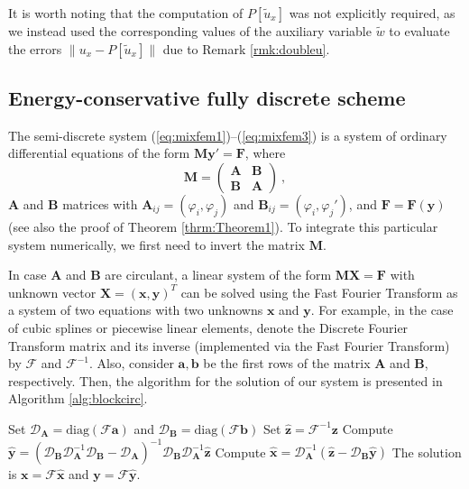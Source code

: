 \documentclass{amsart}
\newcommand{\diag}{\mathrm{diag}}
\newcommand{\by}{\mathbf{y}}
\newcommand{\ba}{\mathbf{a}}
\newcommand{\bb}{\mathbf{b}}
\newcommand{\bx}{\mathbf{x}}
\newcommand{\bF}{\mathbf{F}}
\newcommand{\bz}{\mathbf{z}}
\newcommand{\bA}{\mathbf{A}}
\newcommand{\bB}{\mathbf{B}}
\newcommand{\bM}{\mathbf{M}}
\newcommand{\bX}{\mathbf{X}}
\begin{document}
It is worth noting that the computation of $P[\tilde{u}_x]$ was not explicitly required, as we instead used the corresponding values of the auxiliary variable $\tilde{w}$ to evaluate the errors $\|u_x - P[\tilde{u}_x]\|$ due to Remark \ref{rmk:doubleu}.


\subsection{Energy-conservative fully discrete scheme}

The semi-discrete system (\ref{eq:mixfem1})--(\ref{eq:mixfem3}) is a system of ordinary differential equations of the form $\bM\by'=\bF$, where $$\bM = \begin{pmatrix}
    \bA & \bB\\
    \bB & \bA
\end{pmatrix}\ ,$$
$\bA$ and $\bB$ matrices with $\bA_{ij}=(\varphi_i,\varphi_j)$ and $\bB_{ij}=(\varphi_i,\varphi_j')$, and $\bF=\bF(\by)$ (see also the proof of Theorem \ref{thrm:Theorem1}). To integrate this particular system numerically, we first need to invert the matrix $\bM$. 

In case $\bA$ and $\bB$ are circulant, a linear system of the form
$\bM\bX=\bF$ with unknown vector $\bX=(\bx,\by)^T$ can be solved using the Fast Fourier Transform as a system of two equations with two unknowns $\bx$ and $\by$. For example, in the case of cubic splines or piecewise linear elements, denote the Discrete Fourier Transform matrix and its inverse (implemented via the Fast Fourier Transform) by $\mathcal{F}$ and $\mathcal{F}^{-1}$. Also, consider $\ba, \bb$ be the first rows of the matrix $\bA$ and $\bB$, respectively. Then, the algorithm for the solution of our system is presented in Algorithm \ref{alg:blockcirc}.

\begin{algorithm}
\begin{algorithmic}
\State Set $\mathcal{D}_\bA=\diag(\mathcal{F}\ba)$ and $\mathcal{D}_\bB=\diag(\mathcal{F}\bb)$
\State Set $\hat{\bz}=\mathcal{F}^{-1}\bz$
\State Compute $\hat{\by}=(\mathcal{D}_\bB \mathcal{D}_\bA^{-1}\mathcal{D}_\bB-\mathcal{D}_\bA)^{-1} \mathcal{D}_\bB\mathcal{D}_\bA^{-1}\hat{\bz}$ 
\State Compute $\hat{\bx}=\mathcal{D}_\bA^{-1}(\hat{\bz}-\mathcal{D}_\bB \hat{\by})$
\State The solution is $\bx=\mathcal{F}\hat{\bx}$ and $\by=\mathcal{F}\hat{\by}$. 
\end{algorithmic}\caption{Solution of block circulant system using FFT}\label{alg:blockcirc}
\end{algorithm}
\end{document}
